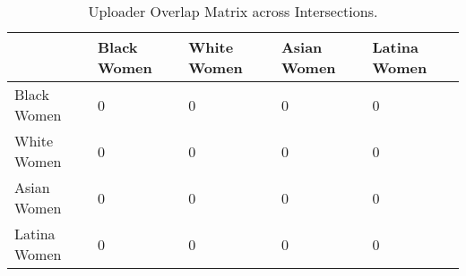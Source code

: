 \begin{table}[htbp]
\centering
\caption{Uploader Overlap Matrix across Intersections.}
\label{tab:eda_uploader_overlap_matrix}
\begin{tabular}{lllll}
\toprule
 & Black Women & White Women & Asian Women & Latina Women \\
\midrule
Black Women & 0 & 0 & 0 & 0 \\
White Women & 0 & 0 & 0 & 0 \\
Asian Women & 0 & 0 & 0 & 0 \\
Latina Women & 0 & 0 & 0 & 0 \\
\bottomrule
\end{tabular}

\end{table}